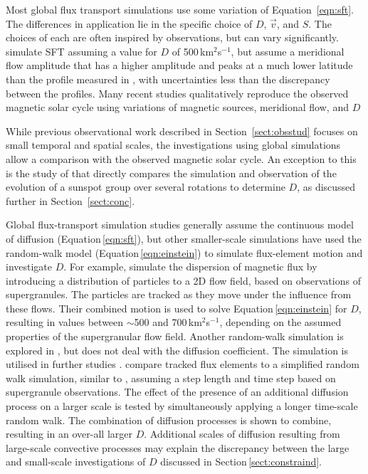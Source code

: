 Most global flux transport simulations use some variation of Equation~\ref{eqn:sft}. The differences in application lie in the specific choice of $D$, $\vec{v}$, and $S$. The choices of each are often inspired by observations, but can vary significantly.
\cite{Wang:2009} simulate \gls{SFT} assuming a value for $D$ of 500\,km$^2$s$^{-1}$, but assume a meridional flow amplitude that has a higher amplitude and peaks at a much lower latitude than the profile measured in \cite{Hathaway:2011}, with uncertainties less than the discrepancy between the profiles. 
Many recent studies qualitatively reproduce the observed magnetic solar cycle using variations of magnetic sources, meridional flow, and $D$ \citep{Wang:1989,Dikpati:2004,Schrijver:2008b}

While previous observational work described in Section~\ref{sect:obsstud} focuses on small temporal and spatial scales, the investigations using global simulations allow a comparison with the observed magnetic solar cycle. %
An exception to this is the study of \cite{Wang:1989} that directly compares the simulation and observation of the evolution of a sunspot group over several rotations to determine $D$, as discussed further in Section~\ref{sect:conc}.

Global flux-transport simulation studies generally assume the continuous model of diffusion (Equation\,\ref{eqn:sft}), but other smaller-scale simulations have used the random-walk model (Equation\,\ref{eqn:einstein}) to simulate flux-element motion and investigate $D$. For example, \cite{Simon:1995} simulate the dispersion of magnetic flux by introducing a distribution of particles to a 2D flow field, based on observations of supergranules. The particles are tracked as they move under the influence from these flows. Their combined motion is used to solve Equation\,\ref{eqn:einstein} for $D$, resulting in values between $\sim$500 and 700\,km$^2$s$^{-1}$, depending on the assumed properties of the supergranular flow field.
Another random-walk simulation is explored in \cite{Schrijver:1997b}, but does not deal with the diffusion coefficient. The simulation is utilised in further studies \citep{Schrijver:2001,Schrijver:2003,Schrijver:2008b}.
\cite{Hagenaar:1999} compare tracked flux elements to a simplified random walk simulation, similar to \cite{Simon:1995},  assuming a step length and time step based on supergranule observations. The effect of the presence of an additional diffusion process on a larger scale is tested by simultaneously applying a longer time-scale random walk. The combination of diffusion processes is shown to combine, resulting in an over-all larger $D$. Additional scales of diffusion resulting from large-scale convective processes may explain the discrepancy between the large and small-scale investigations of $D$ discussed in Section\,\ref{sect:constraind}.



